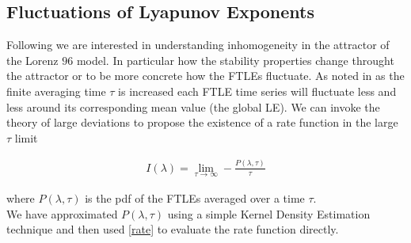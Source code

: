 \subsection{Fluctuations of Lyapunov Exponents} \label{section: FTLE-Fluctuations}

Following \cite{Politi2014} we are interested in understanding inhomogeneity in the attractor of the Lorenz $96$ model. In particular how the stability properties change throught the attractor or to be more concrete how the FTLEs fluctuate. As noted in \cite{Politi2014} as the finite averaging time $\tau$ is increased each FTLE time series will fluctuate less and less around its corresponding mean value (the global LE). We can invoke the theory of large deviations to propose the existence of a rate function in the large $\tau$ limit

\begin{align}
    I(\lambda) = \lim _{\tau \to \infty} - \frac{P(\lambda, \tau)}{\tau} \label{rate}
\end{align}

where $P(\lambda, \tau)$ is the pdf of the FTLEs averaged over a time $\tau$.\\

We have approximated $P(\lambda, \tau)$ using a simple Kernel Density Estimation technique and then used \ref{rate} to evaluate the rate function directly.
